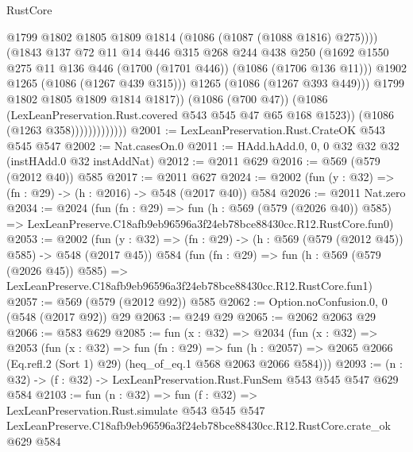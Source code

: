 \begin{lexlean}{RustCore}
\begin{coremodule}
                                    @1799
                                    @1802
                                    @1805
                                    @1809
                                    @1814
                                    (@1086 (@1087 (@1088 @1816) @275))))
                                (@1843
                                  @137
                                  @72
                                  @11
                                  @14
                                  @446
                                  @315
                                  @268
                                  @244
                                  @438
                                  @250
                                  (@1692
                                    @1550
                                    @275
                                    @11
                                    @136
                                    @446
                                    (@1700 (@1701 @446))
                                    (@1086 (@1706 @136 @11)))
                                  @1902
                                  @1265
                                  (@1086 (@1267 @439 @315)))
                                @1265
                                (@1086 (@1267 @393 @449)))
                              @1799
                              @1802
                              @1805
                              @1809
                              @1814
                              @1817))
                          (@1086 (@700 @47))
                          (@1086 (LexLeanPreservation.Rust.covered @543 @545 @47 @65 @168 @1523))
                          (@1086 (@1263 @358)))))))))))))
@2001 := LexLeanPreservation.Rust.CrateOK @543 @545 @547
@2002 := Nat.casesOn.{0}
@2011 := HAdd.hAdd.{0, 0, 0} @32 @32 @32 (instHAdd.{0} @32 instAddNat)
@2012 := @2011 @629
@2016 := @569 (@579 (@2012 @40)) @585
@2017 := @2011 @627
@2024 := @2002 (fun (y : @32) => (fn : @29) -> (h : @2016) -> @548 (@2017 @40)) @584
@2026 := @2011 Nat.zero
@2034 := @2024
    (fun (fn : @29) =>
    fun (h : @569 (@579 (@2026 @40)) @585) =>
    LexLeanPreserve.C18afb9eb96596a3f24eb78bce88430cc.R12.RustCore.fun0)
@2053 := @2002
    (fun (y : @32) => (fn : @29) -> (h : @569 (@579 (@2012 @45)) @585) -> @548 (@2017 @45))
    @584
    (fun (fn : @29) =>
    fun (h : @569 (@579 (@2026 @45)) @585) =>
    LexLeanPreserve.C18afb9eb96596a3f24eb78bce88430cc.R12.RustCore.fun1)
@2057 := @569 (@579 (@2012 @92)) @585
@2062 := Option.noConfusion.{0, 0} (@548 (@2017 @92)) @29
@2063 := @249 @29
@2065 := @2062 @2063 @29
@2066 := @583 @629
@2085 := fun (x : @32) =>
  @2034
    (fun (x : @32) =>
    @2053
      (fun (x : @32) =>
      fun (fn : @29) =>
      fun (h : @2057) =>
      @2065 @2066 (Eq.refl.{2} (Sort 1) @29) (heq_of_eq.{1} @568 @2063 @2066 @584)))
@2093 := (n : @32) -> (f : @32) -> LexLeanPreservation.Rust.FunSem @543 @545 @547 @629 @584
@2103 := fun (n : @32) =>
  fun (f : @32) =>
  LexLeanPreservation.Rust.simulate
    @543
    @545
    @547
    LexLeanPreserve.C18afb9eb96596a3f24eb78bce88430cc.R12.RustCore.crate_ok
    @629
    @584
\end{coremodule}
\end{lexlean}
